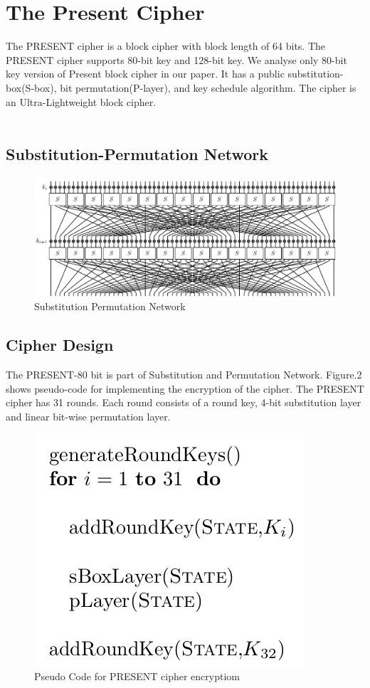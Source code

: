 \documentclass[journal=tosc,preprint]{iacrtrans}
\begin{document}
\section{The Present Cipher}
The PRESENT cipher is a block cipher with block length of 64 bits. The PRESENT cipher supports 80-bit key and 128-bit key. We analyse only 80-bit key version of Present block cipher in our paper. It has a public substitution-box(S-box), bit permutation(P-layer), and key schedule algorithm. The cipher is an Ultra-Lightweight block cipher.\\\\
\subsection{Substitution-Permutation Network}
\begin{figure}[H]
	\centering
	\includegraphics[width=\linewidth]{PRESENT_diagram.pdf}
	\caption{Substitution Permutation Network}
\end{figure}
\subsection{Cipher Design}
The PRESENT-80 bit is part of Substitution and Permutation Network. Figure.2 shows pseudo-code for implementing the encryption of the cipher. The PRESENT cipher has 31 rounds.  Each round consists of a round key, 4-bit substitution layer and linear bit-wise
permutation layer. 
\begin{figure}[h!]
	\centering
	\includegraphics[width=0.34\linewidth, height=0.15\textheight]{"Screenshot from 2021-11-06 08-28-01"}
	\caption{Pseudo Code for PRESENT cipher encryptiom}
	\label{fig:screenshot-from-2021-11-06-08-28-01}
\end{figure}\\
\end{document}
